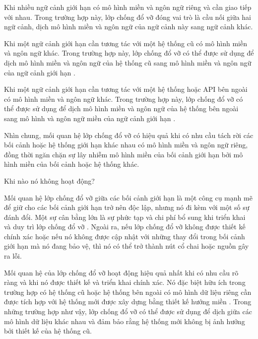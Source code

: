 Khi nhiều ngữ cảnh giới hạn có mô hình miền và ngôn ngữ riêng và cần giao tiếp với nhau. Trong trường hợp này, lớp chống đổ vỡ đóng vai trò là cầu nối giữa hai ngữ cảnh, dịch mô hình miền và ngôn ngữ của ngữ cảnh này sang ngữ cảnh khác.

Khi một ngữ cảnh giới hạn cần tương tác với một hệ thống cũ có mô hình miền và ngôn ngữ khác. Trong trường hợp này, lớp chống đổ vỡ có thể được sử dụng để dịch mô hình miền và ngôn ngữ của hệ thống cũ sang mô hình miền và ngôn ngữ của ngữ cảnh giới hạn .

Khi một ngữ cảnh giới hạn cần tương tác với một hệ thống hoặc API bên ngoài có mô hình miền và ngôn ngữ khác. Trong trường hợp này, lớp chống đổ vỡ có thể được sử dụng để dịch mô hình miền và ngôn ngữ của hệ thống bên ngoài sang mô hình và ngôn ngữ miền của ngữ cảnh giới hạn .

Nhìn chung, mối quan hệ lớp chống đổ vỡ có hiệu quả khi có nhu cầu tách rời các bối cảnh hoặc hệ thống giới hạn khác nhau có mô hình miền và ngôn ngữ riêng, đồng thời ngăn chặn sự lây nhiễm mô hình miền của bối cảnh giới hạn bởi mô hình miền của bối cảnh hoặc hệ thống khác.

Khi nào nó không hoạt động?

Mối quan hệ lớp chống đổ vỡ giữa các bối cảnh giới hạn là một công cụ mạnh mẽ để giữ cho các bối cảnh giới hạn trở nên độc lập, nhưng nó đi kèm với một số sự đánh đổi. Một sự cân bằng lớn là sự phức tạp và chi phí bổ sung khi triển khai và duy trì lớp chống đổ vỡ . Ngoài ra, nếu lớp chống đổ vỡ không được thiết kế chính xác hoặc nếu nó không được cập nhật với những thay đổi trong bối cảnh giới hạn mà nó đang bảo vệ, thì nó có thể trở thành nút cổ chai hoặc nguồn gây ra lỗi.

Mối quan hệ của lớp chống đổ vỡ hoạt động hiệu quả nhất khi có nhu cầu rõ ràng và khi nó được thiết kế và triển khai chính xác. Nó đặc biệt hữu ích trong trường hợp có hệ thống cũ hoặc hệ thống bên ngoài có mô hình dữ liệu riêng cần được tích hợp với hệ thống mới được xây dựng bằng thiết kế hướng miền . Trong những trường hợp như vậy, lớp chống đổ vỡ có thể được sử dụng để dịch giữa các mô hình dữ liệu khác nhau và đảm bảo rằng hệ thống mới không bị ảnh hưởng bởi thiết kế của hệ thống cũ.





